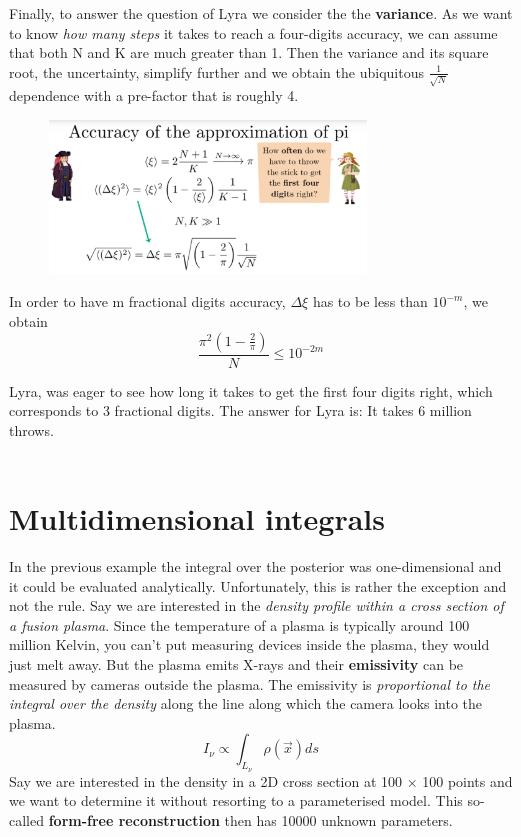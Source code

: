 \documentclass[12pt, a4paper]{scrartcl}
\begin{document}
Finally, to answer the question of Lyra we consider the the \textbf{variance}. 
As we want to know \textit{how many steps} it takes to reach a four-digits accuracy,
we can assume that both N and K are much greater than 1. Then the
variance and its square root, the uncertainty, simplify further
and we obtain the ubiquitous $\frac{1}{\sqrt{N}}$ dependence with a
pre-factor that is roughly 4.%
 \begin{figure}[H]
	\centering
	\includegraphics[width=0.75\textwidth]{9_4.png}
\end{figure}
In order to have m fractional digits accuracy, $\Delta \xi$ has to be less than $10^{-m}$, we obtain \[\frac{\pi^2(1-\frac{2}{\pi})}{N}\leq 10^{-2m}\]

Lyra, was eager to see how long it takes to get the ﬁrst four digits right,
which corresponds to 3 fractional digits. The answer for
Lyra is: It takes 6 million throws.\\

\\

\section*{Multidimensional integrals}
In the previous example the integral over the posterior was one-dimensional
and it could be evaluated analytically. Unfortunately, this is rather the exception and not the rule.
Say we are interested in the \textit{density proﬁle within a cross section of a
fusion plasma}. Since the temperature of a plasma is typically around 100 million
Kelvin, you can’t put measuring devices inside the plasma, they would
just melt away. But the plasma emits X-rays and their  \textbf{emissivity} can be
measured by cameras outside the plasma. The emissivity is \textit{proportional to
the integral over the density} along the line along which the camera looks
into the plasma.
\[I_{\nu}\propto \int_{L_{\nu}}\rho(\vec{x})ds\]
Say we are interested in the density in a 2D cross section at 100 × 100 points
and we want to determine it without resorting to a parameterised model.
This so-called  \textbf{form-free reconstruction} then has 10000 unknown parameters.\\
\end{document}
